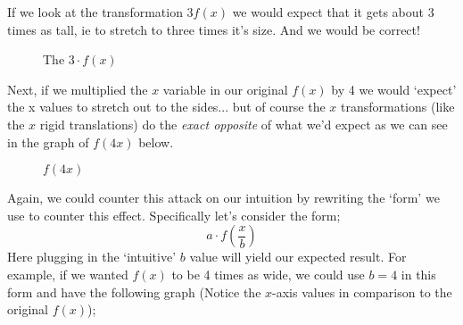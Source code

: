 \documentclass{ximeraXloud}
\begin{document}
    If we look at the transformation $3f(x)$ we would expect that it gets about 3 times as tall, ie to stretch to three times it's size. And we would be correct!
    
    \begin{figure}[H]\centering
        \caption{The $3\cdot f(x)$}
    \end{figure}
    
    Next, if we multiplied the $x$ variable in our original $f(x)$ by 4 we would `expect' the x values to stretch out to the sides... but of course the $x$ transformations (like the $x$ rigid translations) do the \textit{exact opposite} of what we'd expect as we can see in the graph of $f(4x)$ below.
    
    \begin{figure}[H]\centering
        \caption{$f(4x)$}
    \end{figure}
    
    
    Again, we could counter this attack on our intuition by rewriting the `form' we use to counter this effect. Specifically let's consider the form;
    \[
        a\cdot f\left(\frac{x}{b}\right)
    \]
    Here plugging in the `intuitive' $b$ value will yield our expected result. For example, if we wanted $f(x)$ to be 4 times as wide, we could use $b = 4$ in this form and have the following graph (Notice the $x$-axis values in comparison to the original $f(x)$);
    
\end{document}
